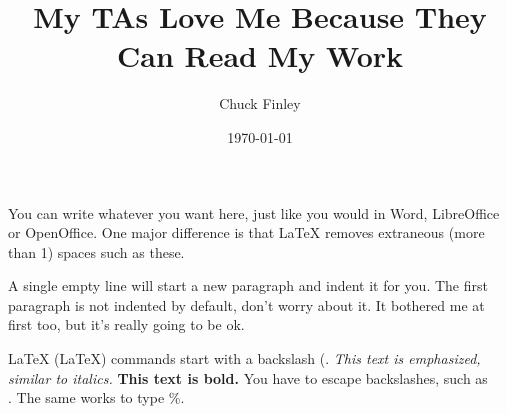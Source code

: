 \documentclass[12pt]{article}
\title{My TAs Love Me Because They Can Read My Work}
\author{Chuck Finley}
\date{\today}
\begin{document}
    \maketitle
    You can write whatever you want here, just like
    you would in Word, LibreOffice or OpenOffice.  
    One major difference is that LaTeX removes 
    extraneous (more than 1) spaces    such   as   
    these.
	
    A single empty line will start a new paragraph 
    and indent it for you. The first paragraph is not 
    indented by default, don't worry about it. It bothered 
    me at first too, but it's really going to be ok.
	
    LaTeX (\LaTeX) commands start with a backslash (\). 
    \emph{This text is emphasized, similar to italics.} 
    \textbf{This text is bold.}  You have to escape 
    backslashes, such as \\.  The same works to type \%.
\end{document}
